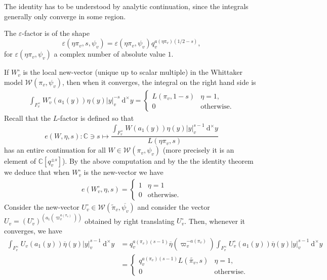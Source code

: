 \documentclass[a4paper,11pt]{amsart}
\theoremstyle{definition}
\newcommand{\CC}{\mathbb{C}}
\begin{document}
The identity has to be understood by analytic continuation, since the integrals generally only converge in some region.





The $\varepsilon$-factor is of the shape
\[\varepsilon(\eta\pi_v,s,\psi_v) = \varepsilon(\eta\pi_v,\psi_v)q_v^{a(\eta\pi_v)(1/2-s)},\]
for $\varepsilon(\eta\pi_v,\psi_v)$ a complex number of absolute value $1$. 





If $W^{\circ}_v$ is the local new-vector (unique up to scalar multiple) in the Whittaker model $\mathcal{W}(\pi_v,\psi_v)$, then when it converges, the integral on the right hand side is 
\begin{align*}
    \int_{F_v^{\times}}W^{\circ}_v(a_1(y))\eta(y)\vert{y}\vert_v^{-s}\ \mathrm{d}^{\times}y = \begin{cases}
        L(\pi_v,1-s)& \eta = 1,\\
        0 & \text{otherwise.}
    \end{cases}
\end{align*}
Recall that the $L$-factor is defined so that 
\[e(W,\eta,s)\colon \CC\ni s\mapsto \frac{\int_{F_v^{\times}}W(a_1(y))\eta(y)\vert{y}\vert_v^{s-1}\ \mathrm{d}^{\times}y}{L(\eta\pi_v,s)} \]
has an entire continuation for all $W\in \mathcal{W}(\pi_v,\psi_v)$ (more precisely it is an element of $\CC[q_v^{\pm s}]$).
By the above computation and by the the identity theorem we deduce that when $W^{\circ}_v$ is the new-vector we have \begin{align*}
    e(W^{\circ}_v,\eta,s) = \begin{cases}
        1 & \eta =1 \\ 
        0 & \text{otherwise.}
    \end{cases}
\end{align*}
Consider the new-vector $U^{\circ}_v\in \mathcal{W}(\tilde{\pi}_v,\overline{\psi_v}) $  and consider the vector $U_v = (U^{\circ}_v)^{(a_1(\varpi_v^{a(\pi_v)}))}$ obtained by right translating $U_v^{\circ}$. Then, whenever it converges, we have 
\begin{align*}\int_{F_v^{\times}}U_v(a_1(y))\overline{\eta}(y)  \vert{y}\vert_v^{s-1} \ \mathrm{d}^{\times}y &= q_v^{a(\pi_v)(s-1)}\overline{\eta}(\varpi_v^{-a(\pi_v)})\int_{F_v^{\times}}U^{\circ}_v(a_1(y))\overline{\eta}(y)\vert{y}\vert_v^{s-1}\ \mathrm{d}^{\times}y\\ &=\begin{cases}
    q_v^{a(\pi_v)(s-1)}L(\tilde{\pi_v},s)&\eta =1, \\
    0 & \text{otherwise.}
\end{cases}\end{align*}
\end{document}
